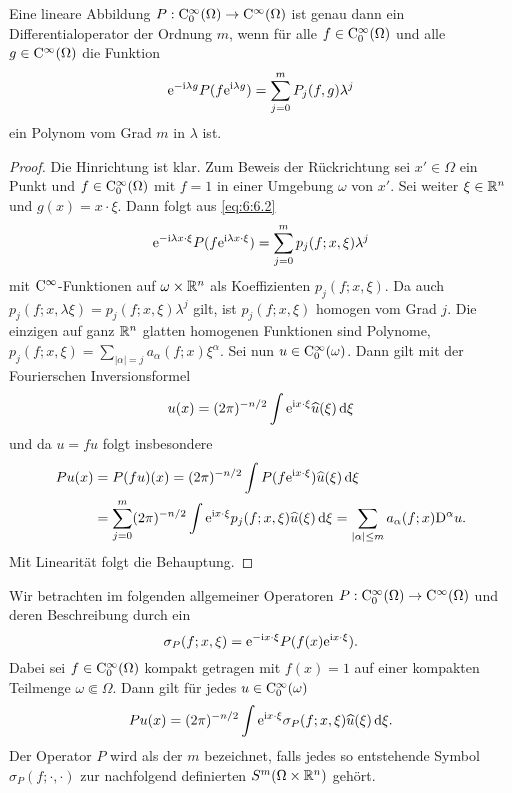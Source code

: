 \begin{lem}
Eine  lineare Abbildung   $P:\mathrm C_0^\infty(\Omega)\to\mathrm C^\infty(\Omega)$ ist genau dann ein Differentialoperator der Ordnung $m$, wenn für alle $f\in\mathrm C_0^\infty(\Omega)$ und alle $g\in\mathrm C^\infty(\Omega)$ die Funktion 
\begin{equation}\label{eq:6:6.2}
\mathrm e^{-\mathrm i\lambda g} P(f\mathrm e^{\mathrm i\lambda g}) = \sum_{j=0}^m P_j(f,g) \lambda^j
\end{equation}
ein Polynom vom Grad $m$ in $\lambda$ ist.
\end{lem}
\begin{proof}
Die Hinrichtung ist klar. Zum Beweis der Rückrichtung sei $x'\in\Omega$ ein Punkt und $f\in\mathrm C_0^\infty(\Omega)$ mit $f=1$  in einer Umgebung $\omega$ von $x'$. Sei weiter $\xi\in\mathbb R^n$ und $g(x) = x\cdot\xi$. Dann folgt aus \eqref{eq:6:6.2}
\begin{equation}
    \mathrm e^{-\mathrm i \lambda x\cdot\xi} P ( f\mathrm e^{\mathrm i \lambda x\cdot\xi}) = \sum_{j=0}^m p_j(f;x,\xi) \lambda^j
\end{equation}
mit $\mathrm C^\infty$-Funktionen auf $\omega\times\mathbb R^n$ als Koeffizienten $p_j(f;x,\xi)$. Da auch
$p_j(f;x,\lambda\xi)=p_j(f;x,\xi)\lambda^j$ gilt, ist $p_j(f;x,\xi)$ homogen vom Grad $j$. Die einzigen auf ganz $\mathbb R^n$ glatten homogenen Funktionen sind Polynome,
$p_j(f;x,\xi) = \sum_{|\alpha|=j} a_\alpha(f;x) \xi^\alpha$. Sei nun $u\in\mathrm C_0^\infty(\omega)$. Dann gilt mit der Fourierschen Inversionsformel
\begin{equation}
    u(x) = (2\pi)^{-n/2} \int \mathrm e^{\mathrm i x\cdot\xi} \widehat u(\xi)\,\mathrm d\xi
\end{equation}
und da $u=fu$ folgt insbesondere 
\begin{align}
    Pu(x) &= P(fu)(x) = (2\pi)^{-n/2} \int P(f \mathrm e^{\mathrm i x\cdot\xi}) \widehat u(\xi)\,\mathrm d\xi \notag \\&= \sum_{j=0}^m (2\pi)^{-n/2} \int \mathrm e^{\mathrm i x\cdot\xi} p_j(f;x,\xi) \widehat u(\xi)\,\mathrm d\xi
    = \sum_{|\alpha|\le m} a_\alpha(f;x)\mathrm D^\alpha u.
\end{align}
Mit Linearität folgt die Behauptung.
\end{proof}

Wir betrachten im folgenden allgemeiner Operatoren $P : \mathrm C_0^\infty(\Omega) \to \mathrm C^\infty(\Omega)$ und deren Beschreibung durch ein 
\begin{equation}\label{eq:6:6.6}
    \sigma_P(f; x,\xi) = \mathrm e^{-\mathrm i x\cdot\xi} P( f(x) \mathrm e^{\mathrm i x\cdot\xi}).
\end{equation}  
Dabei sei $f\in\mathrm C_0^\infty(\Omega)$ kompakt getragen mit $f(x)=1$ auf einer kompakten Teilmenge $\omega\Subset\Omega$. 
Dann gilt für jedes $u\in\mathrm C_0^\infty(\omega)$ 
\begin{equation}
   P u (x) = (2\pi)^{-n/2} \int \mathrm e^{\mathrm i x\cdot\xi} \sigma_P(f; x,\xi) \widehat u(\xi) \,\mathrm d\xi.
\end{equation}
Der Operator $P$ wird als  der  $m$ bezeichnet, falls jedes so entstehende Symbol 
$\sigma_P(f;\cdot,\cdot)$ zur nachfolgend definierten  $S^m(\Omega\times\mathbb R^n)$ gehört.

